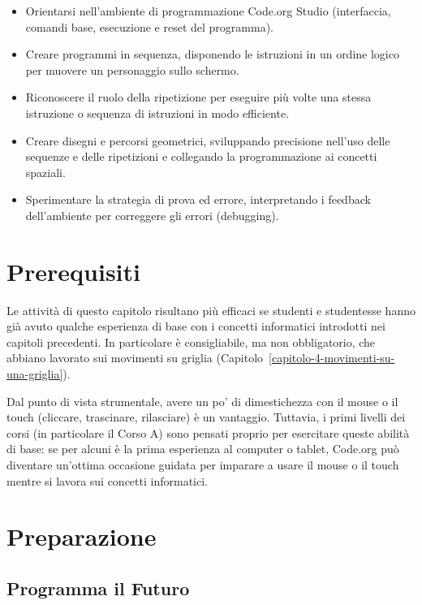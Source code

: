 \begin{itemize}
\item
  Orientarsi nell'ambiente di programmazione Code.org Studio (interfaccia, comandi base, esecuzione e reset del programma).
\item
  Creare programmi in sequenza, disponendo le istruzioni in un ordine logico per muovere un personaggio sullo schermo.
\item
  Riconoscere il ruolo della ripetizione per eseguire più volte una stessa istruzione o sequenza di istruzioni in modo efficiente.
\item
  Creare disegni e percorsi geometrici, sviluppando precisione nell'uso delle sequenze e delle ripetizioni e collegando la programmazione ai concetti spaziali.
\item
  Sperimentare la strategia di prova ed errore, interpretando i feedback dell'ambiente per correggere gli errori (debugging).
\end{itemize}

\section{Prerequisiti }\label{prerequisiti-4}

Le attività di questo capitolo risultano più efficaci se studenti e studentesse hanno già avuto qualche esperienza di base con i concetti informatici introdotti nei capitoli precedenti. In particolare è consigliabile, ma non obbligatorio, che abbiano lavorato sui movimenti su griglia (Capitolo~\ref{capitolo-4-movimenti-su-una-griglia}).

Dal punto di vista strumentale, avere un po' di dimestichezza con il mouse o il touch (cliccare, trascinare, rilasciare) è un vantaggio. Tuttavia, i primi livelli dei corsi (in particolare il Corso A) sono pensati proprio per esercitare queste abilità di base: se per alcuni è la prima esperienza al computer o tablet, Code.org può diventare un'ottima occasione guidata per imparare a usare il mouse o il touch mentre si lavora sui concetti informatici.

\section{Preparazione }\label{preparazione-7}

\subsection{Programma il Futuro }\label{programma-il-futuro}

